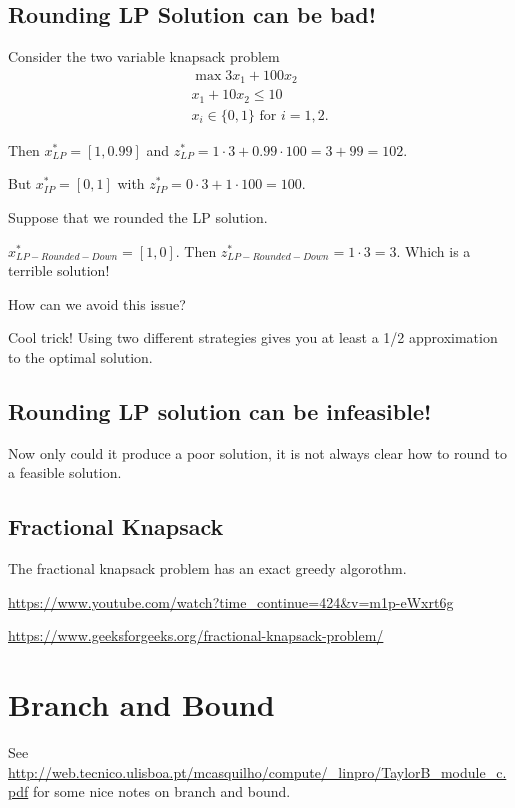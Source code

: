 \documentclass[../open-optimization/open-optimization.tex]{subfiles}
\begin{document}
  
  
  \subsection{Rounding LP Solution can be bad!}
  
  Consider the two variable knapsack problem
  \begin{align}
  \max   3x_1 + 100 x_2\\
              x_1  + 10 x_2 \leq 10\\
              x_i \in \{0,1\} \text{ for } i=1,2.
  \end{align}
  
  Then $x^*_{LP} = [1, 0.99]$ and $z^*_{LP} = 1\cdot 3 + 0.99\cdot 100 = 3 + 99 = 102.$
  
  But $x^*_{IP} = [0,1]$ with $z^*_{IP} = 0\cdot 3 + 1 \cdot 100 = 100$.
  
  Suppose that we rounded the LP solution.  
  
  $x^*_{LP-Rounded-Down} = [1,0]$.  Then $z^*_{LP-Rounded-Down} = 1\cdot 3 = 3$.  Which is a terrible solution!
  
  
  How can we avoid this issue?
  
  
  Cool trick!   Using two different strategies gives you at least a 1/2 approximation to the optimal solution.
  
  
  \subsection{Rounding LP solution can be infeasible!}
  Now only could it produce a poor solution, it is not always clear how to round to a feasible solution.  
  
\subsection{Fractional Knapsack}
The fractional knapsack problem has an exact greedy algorothm.

\url{https://www.youtube.com/watch?time_continue=424&v=m1p-eWxrt6g}

\url{https://www.geeksforgeeks.org/fractional-knapsack-problem/}

\section{Branch and Bound}

See \url{http://web.tecnico.ulisboa.pt/mcasquilho/compute/_linpro/TaylorB_module_c.pdf} for some nice notes on branch and bound.
\end{document}
